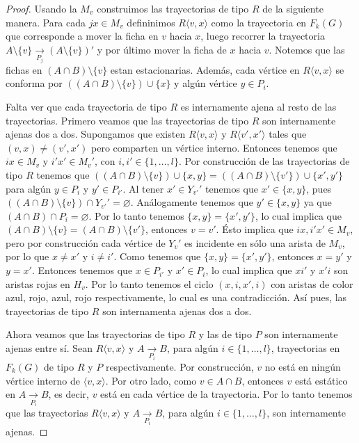 \begin{proof}
    Usando la $M_v$ construimos las trayectorias de tipo $R$ de la siguiente
    manera. Para cada $jx \in M_v$ defininimos $R\langle v, x \rangle$ como la
    trayectoria en $F_k(G)$ que corresponde a mover la ficha en $v$ hacia $x$,
    luego recorrer la trayectoria $A\setminus \{v\} \xrightarrow[P_j]{}
    (A\setminus \{v\})'$ y por \'ultimo mover la ficha de $x$ hacia $v$. Notemos
    que las fichas en $(A\cap B)\setminus \{v\}$ estan estacionarias. Adem\'as,
    cada v\'ertice en $R\langle v,x \rangle$ se conforma por $((A\cap
    B)\setminus \{v\}) \cup \{x\}$ y alg\'un v\'ertice $y \in P_i$.


    Falta ver que cada trayectoria de tipo $R$ es internamente ajena al resto de
    las trayectorias. Primero veamos que las trayectorias de tipo $R$ son
    internamente ajenas dos a dos. Supongamos que existen $R \langle v, x
    \rangle$ y $R\langle v',x' \rangle$ tales que $(v,x) \neq (v',x')$ pero
    comparten un v\'ertice interno. Entonces tenemos que $ix \in M_v$ y $i'x'\in
    M_v'$, con $i, i' \in \{1, \dots, l\}$. Por construcci\'on de las
    trayectorias de tipo $R$ tenemos que $((A\cap B)\setminus \{v\}) \cup \{x,
    y\} =((A\cap B)\setminus \{v'\}) \cup \{x', y'\}$ para alg\'un $y \in P_i$ y
    $y' \in P_{i'}$. Al tener $x'\in Y_{v'} '$ tenemos que $x'\in \{x,y\}$, pues
    $((A \cap B )\setminus \{v\}) \cap Y_{v'}'= \varnothing$. An\'alogamente
    tenemos que $y'\in \{x, y\}$ ya que $(A \cap B) \cap P_i = \varnothing$. Por
    lo tanto tenemos $\{x,y\}= \{x',y'\}$, lo cual implica que $(A\cap
    B)\setminus \{v\} = (A\cap B)\setminus \{v'\}$, entonces $v = v'$. \'Esto
    implica que $ix, i'x' \in M_v$, pero por construcci\'on cada v\'ertice de
    $Y_v '$ es incidente en s\'olo una arista de $M_v$, por lo que $x \neq x'$ y
    $i \neq i'$. Como tenemos que $\{x, y\}=\{x', y'\}$, entonces $x=y'$ y
    $y=x'$. Entonces tenemos que $x \in P_{i'}$ y $x'\in P_i$, lo cual implica
    que $xi'$ y $x'i$ son aristas rojas en $H_v$. Por lo tanto tenemos el ciclo
    $(x, i, x', i)$ con aristas de color azul, rojo, azul, rojo respectivamente,
    lo cual es una contradicci\'on. As\'i pues, las trayectorias de tipo $R$ son
    internamenta ajenas dos a dos.

    Ahora veamos que las trayectorias de tipo $R$ y las de tipo $P$ son
    internamente ajenas entre s\'i{}. Sean $R\langle v,x \rangle$ y $A
    \xrightarrow[P_i]{}  B$, para alg\'un $i \in \{1, \dots, l\}$, trayectorias
    en $F_k(G)$ de tipo $R$ y $P$ respectivamente. Por construcci\'on, $v$ no
    est\'a en ning\'un v\'ertice interno de $\langle v,x \rangle$. Por otro
    lado, como $ v \in A\cap B$, entonces $v$ est\'a est\'atico en $A
    \xrightarrow[P_i]{}  B$, es decir, $v$ est\'a en cada v\'ertice de la
    trayectoria. Por lo tanto tenemos que las trayectorias $R\langle v,x
    \rangle$ y $A \xrightarrow[P_i]{}  B$, para alg\'un $i \in \{1, \dots, l\}$,
    son internamente ajenas.


\end{proof}
